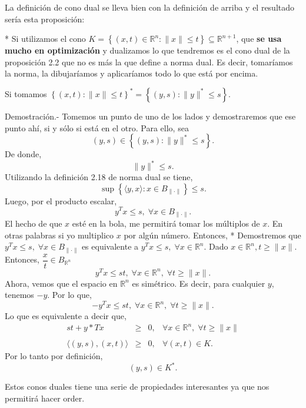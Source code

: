 \begin{paracol}{2}
\begin{tcolorbox}[colframe=white]
La definición de cono dual se lleva bien con la definición de arriba y el resultado sería esta proposición: 
\end{tcolorbox}

\switchcolumn[1]*{\noindent\scriptsize
    Si utilizamos el cono $K=\left\{(x,t)\in \mathbb{R}^n:\|x\|\leq t\right\}\subseteq \mathbb{R}^{n+1}$, que \textbf{se usa mucho en optimización} y dualizamos lo que tendremos es el cono dual de la proposición 2.2 que no es más la que define a norma dual. Es decir, tomaríamos la norma, la dibujaríamos y aplicaríamos todo lo que está por encima.  
}
\switchcolumn[0]\noindent
\begin{proposicion}
    Si tomamos $\left\{(x,t):\|x\|\leq t\right\}^*=\left\{(y,s):\|y\|^*\leq s\right\}.$

	Demostración.-\; Tomemos un punto de uno de los lados y demostraremos que ese punto ahí, si y sólo si está en el otro. Para ello, sea 
	$$(y,s)\in \left\{(y,s):\|y\|^*\leq s\right\}.$$
	De donde,
	$$\|y\|^*\leq s.$$
	Utilizando la definición 2.18 de norma dual se tiene,
	$$\sup\left\{\langle y,x\rangle: x\in B_{\|\cdot\|}\right\}\leq s.$$
	Luego, por el producto escalar,
	$$y^Tx\leq s,\;\forall x\in B_{\|\cdot\|}.$$
	El hecho de que $x$ esté en la bola, me permitirá tomar los múltiplos de $x$. En otras palabras si yo multiplico $x$ por algún número. Entonces,
	\switchcolumn[1]*{\noindent\scriptsize
	    Demostremos que $ y^Tx\leq s,\;\forall x\in B_{\|\cdot\|}$ es equivalente a $y^Tx\leq s,\;\forall x\in \mathbb{R}^n$. Dado $x\in \mathbb{R}^n, t\geq \|x\|$. Entonces, $\dfrac{x}{t}\in B_{\mathbb{R}^n}$
	}
	\switchcolumn[0]\noindent
	$$y^Tx\leq st,\;\forall x\in \mathbb{R}^n,\;\forall t\geq \|x\|.$$
	Ahora, vemos que el espacio en $\mathbb{R}^n$ es simétrico. Es decir, para cualquier $y$, tenemos  $-y$. Por lo que,
	$$-y^Tx\leq st,\;\forall x\in \mathbb{R}^n,\;\forall t\geq \|x\|.$$
	Lo que es equivalente a decir que,
	$$
	\begin{array}{rcll}
	    st+y* Tx&\geq& 0,&\forall x\in \mathbb{R}^n,\;\forall t\geq \|x\|\\\\
	    \langle (y,s),(x,t)\rangle&\geq& 0,& \forall (x,t)\in K.
	\end{array}
	$$
	Por lo tanto por definición,
	$$(y,s)\in K^*.$$
\end{proposicion}

\begin{tcolorbox}[colframe=white]
Estos conos duales tiene una serie de propiedades interesantes ya que nos permitirá hacer order.
\end{tcolorbox}


\end{paracol}
